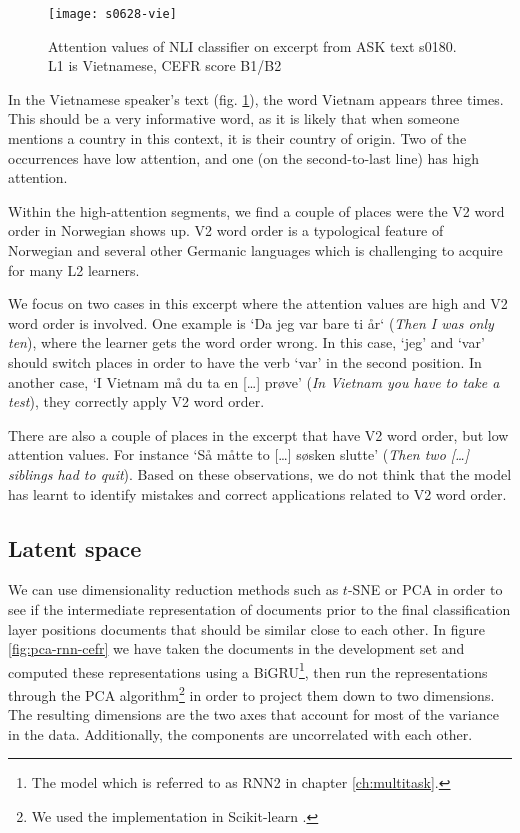 \begin{figure}
  \centering
  \texttt{[image: s0628-vie]}
  \caption[Attention heat map in a text by a Vietnamese speaker]{
    Attention values of NLI classifier on excerpt from ASK text s0180. L1 is
    Vietnamese, CEFR score B1/B2
  }
  \label{fig:vie-attention}
\end{figure}

In the Vietnamese speaker's text (fig. \ref{fig:vie-attention}), the word
Vietnam appears three times. This should be a very informative word, as it is
likely that when someone mentions a country in this context, it is their
country of origin. Two of the occurrences have low attention, and one (on the
second-to-last line) has high attention.

Within the high-attention segments, we find a couple of places were the V2
word order in Norwegian shows up. V2 word order is a typological feature of
Norwegian and several other Germanic languages which is challenging to
acquire for many L2 learners.

We focus on two cases in this excerpt where the attention values are high and
V2 word order is involved. One example is `Da jeg var bare ti år` (\emph{Then
I was only ten}), where the learner gets the word order wrong. In this case,
`jeg' and `var' should switch places in order to have the verb `var' in the
second position. In another case, `I Vietnam må du ta en […] prøve'
(\emph{In Vietnam you have to take a test}), they correctly apply V2 word
order.

There are also a couple of places in the excerpt that have V2 word order, but
low attention values. For instance `Så måtte to […] søsken slutte'
(\emph{Then two […] siblings had to quit}). Based on these observations, we
do not think that the model has learnt to identify mistakes and correct
applications related to V2 word order.


\subsection{Latent space}

We can use dimensionality reduction methods such as $t$-SNE or \ac{PCA} in
order to see if the intermediate representation of documents prior to the
final classification layer positions documents that should be similar close
to each other. In figure \ref{fig:pca-rnn-cefr} we have taken the documents
in the development set and computed these representations using a
BiGRU\footnote{The model which is referred to as RNN2 in chapter
\ref{ch:multitask}.}, then run the representations through the PCA
algorithm\footnote{We used the implementation in Scikit-learn
\autocite{scikit-learn}.} in order to project them down to two dimensions.
The resulting dimensions are the two axes that account for most of the
variance in the data. Additionally, the components are uncorrelated with each
other.

